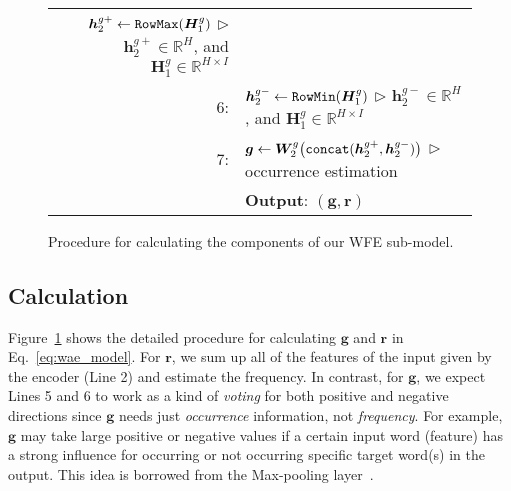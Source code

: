 \documentclass[11pt]{article}
\begin{document}
\begin{figure}[t]
\begin{tabular}{rp{71mm}}
      $\bm{h}^{g+}_2 \leftarrow \mbox{\tt RowMax}(\bm{H}^{g}_1)$
      \hspace{\fill}
      $\triangleright$ {\scriptsize $\bm{h}^{g+}_2\in\mathbb{R}^{H}$, and $\bm{H}^{g}_1\in\mathbb{R}^{H\times I}$}
      \\
  6:&\hspace{0.0em}
      $\bm{h}^{g-}_2 \leftarrow \mbox{\tt RowMin}(\bm{H}^{g}_1)$
      \hspace{\fill}
      $\triangleright$ {\scriptsize $\bm{h}^{g-}_2\in\mathbb{R}^{H}$, and $\bm{H}^{g}_1\in\mathbb{R}^{H\times I}$}
      \\
  7:&\hspace{0.0em}
      $ \bm{g} \leftarrow \bm{W}^{g}_2 \big( \mbox{\tt concat}(\bm{h}^{g+}_2, \bm{h}^{g-}_2)\big)$
      \hspace{\fill}
      $\triangleright$ {\scriptsize  occurrence estimation}
      \\
  \  &\hspace{-1.2em}\textbf{Output}: $({\bm{g}}, {\bm{r}})$
      \\
  \hline
 \end{tabular}
 \caption{Procedure for calculating the components of our WFE sub-model.}
 \label{fig:wfe_calculation}
\end{figure}


\subsection{Calculation}
   Figure~\ref{fig:wfe_calculation} shows the detailed procedure for calculating ${\bm{g}}$ and ${\bm{r}}$ in Eq.~\ref{eq:wae_model}.
   For ${\bm r}$, we sum up all of the features of the input given by the encoder (Line 2) and estimate the frequency.
   In contrast, for ${\bm g}$, we expect Lines 5 and 6 to work as a kind of {\it voting} for both positive and negative directions
   since ${\bm g}$ needs just {\it occurrence} information, not {\it frequency}.
   For example, ${\bm g}$ may take large positive or negative values if a certain input word (feature) has a strong influence for occurring or not occurring specific target word(s) in the output.
   This idea is borrowed from the Max-pooling layer~\cite{DBLP:conf/icml/GoodfellowWMCB13}.
\end{document}
